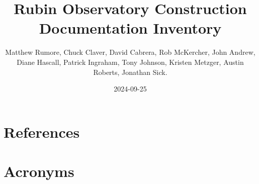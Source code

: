 \documentclass[SE,authoryear,toc]{lsstdoc}
\title{Rubin Observatory Construction Documentation Inventory}
\author{%
Matthew Rumore,
Chuck Claver,
David Cabrera,
Rob McKercher,
John Andrew,
Diane Hascall,
Patrick Ingraham,
Tony Johnson,
Kristen Metzger,
Austin Roberts,
Jonathan Sick.
}
\date{2024-09-25}
\begin{document}
\maketitle






















\newpage
\appendix
\section{References} \label{sec:bib}
\renewcommand{\refname}{} %


\section{Acronyms} \label{sec:acronyms}

\end{document}
